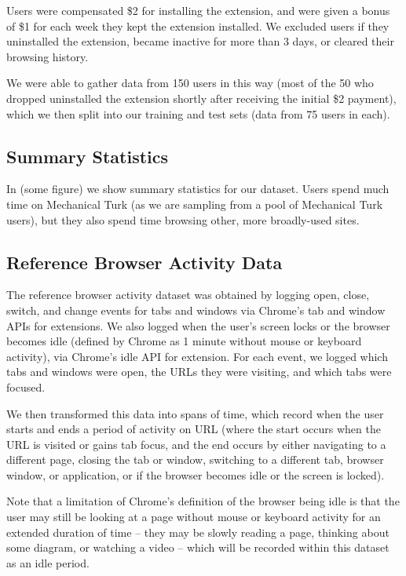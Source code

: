 \documentclass{sigchi}
\begin{document}
Users were compensated \$2 for installing the extension, and were given a bonus of \$1 for each week they kept the extension installed. We excluded users if they uninstalled the extension, became inactive for more than 3 days, or cleared their browsing history.

We were able to gather data from 150 users in this way (most of the 50 who dropped uninstalled the extension shortly after receiving the initial \$2 payment), which we then split into our training and test sets (data from 75 users in each).

\subsection{Summary Statistics}

In (some figure) we show summary statistics for our dataset. Users spend much time on Mechanical Turk (as we are sampling from a pool of Mechanical Turk users), but they also spend time browsing other, more broadly-used sites.

\subsection{Reference Browser Activity Data}

The reference browser activity dataset was obtained by logging open, close, switch, and change events for tabs and windows via Chrome's tab and window APIs for extensions. We also logged when the user's screen locks or the browser becomes idle (defined by Chrome as 1 minute without mouse or keyboard activity), via Chrome's idle API for extension. For each event, we logged which tabs and windows were open, the URLs they were visiting, and which tabs were focused.

We then transformed this data into spans of time, which record when the user starts and ends a period of activity on URL (where the start occurs when the URL is visited or gains tab focus, and the end occurs by either navigating to a different page, closing the tab or window, switching to a different tab, browser window, or application, or if the browser becomes idle or the screen is locked).

Note that a limitation of Chrome's definition of the browser being idle is that the user may still be looking at a page without mouse or keyboard activity for an extended duration of time -- they may be slowly reading a page, thinking about some diagram, or watching a video -- which will be recorded within this dataset as an idle period.
\end{document}
